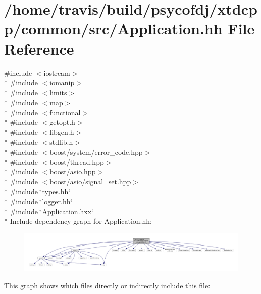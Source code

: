 \hypertarget{src_2Application_8hh}{\section{/home/travis/build/psycofdj/xtdcpp/common/src/\-Application.hh File Reference}
\label{src_2Application_8hh}
}
{\ttfamily \#include $<$iostream$>$}\\*
{\ttfamily \#include $<$iomanip$>$}\\*
{\ttfamily \#include $<$limits$>$}\\*
{\ttfamily \#include $<$map$>$}\\*
{\ttfamily \#include $<$functional$>$}\\*
{\ttfamily \#include $<$getopt.\-h$>$}\\*
{\ttfamily \#include $<$libgen.\-h$>$}\\*
{\ttfamily \#include $<$stdlib.\-h$>$}\\*
{\ttfamily \#include $<$boost/system/error\-\_\-code.\-hpp$>$}\\*
{\ttfamily \#include $<$boost/thread.\-hpp$>$}\\*
{\ttfamily \#include $<$boost/asio.\-hpp$>$}\\*
{\ttfamily \#include $<$boost/asio/signal\-\_\-set.\-hpp$>$}\\*
{\ttfamily \#include \char`\"{}types.\-hh\char`\"{}}\\*
{\ttfamily \#include \char`\"{}logger.\-hh\char`\"{}}\\*
{\ttfamily \#include \char`\"{}Application.\-hxx\char`\"{}}\\*
Include dependency graph for Application.\-hh\-:
\nopagebreak
\begin{figure}[H]
\begin{center}
\leavevmode
\includegraphics[width=350pt]{src_2Application_8hh__incl}
\end{center}
\end{figure}
This graph shows which files directly or indirectly include this file\-:
\nopagebreak
